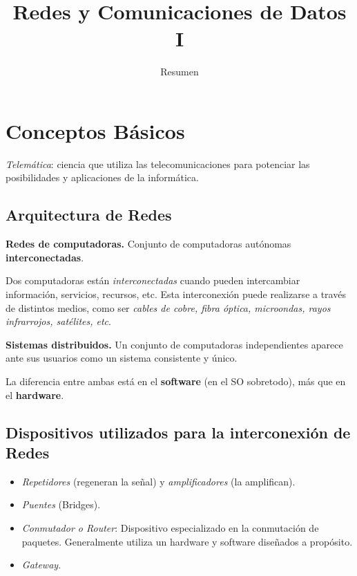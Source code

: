 \documentclass[10pt,a4paper]{article}
\title{Redes y Comunicaciones de Datos I}
\author{Resumen}
\begin{document}
\maketitle

\section{Conceptos Básicos}

\textit{Telemática}: ciencia que utiliza las telecomunicaciones para potenciar las posibilidades y aplicaciones de la informática.

\subsection{Arquitectura de Redes}
\begin{description}
\item \textbf{Redes de computadoras.} Conjunto de computadoras autónomas \textbf{interconectadas}.

Dos computadoras están \textit{interconectadas} cuando pueden intercambiar información, servicios, recursos, etc. Esta interconexión puede realizarse a través de distintos medios, como ser \textit{cables de cobre, fibra óptica, microondas, rayos infrarrojos, satélites, etc}. 

\item \textbf{Sistemas distribuidos.} Un conjunto de computadoras independientes aparece ante sus usuarios como un sistema consistente y único.
\end{description}
La diferencia entre ambas está en el \textbf{software} (en el SO sobretodo), más que en el \textbf{hardware}.

\subsection{Dispositivos utilizados para la interconexión de Redes}

\begin{itemize}
\item \textit{Repetidores} (regeneran la señal) y \textit{amplificadores} (la amplifican).
\item \textit{Puentes} (Bridges).
\item \textit{Conmutador o Router}: Dispositivo especializado en la conmutación de paquetes. Generalmente utiliza un hardware y software diseñados a propósito.
\item \textit{Gateway}.
\end{itemize}
\end{document}
